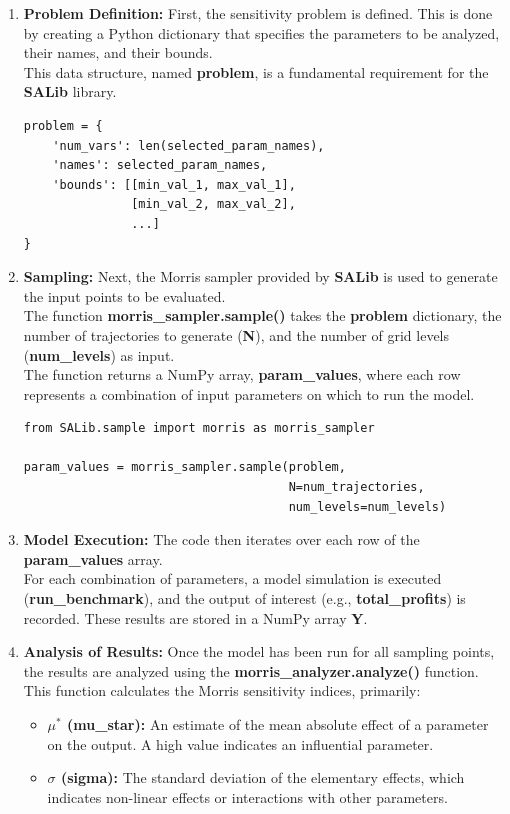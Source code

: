 \begin{enumerate}
    \item \textbf{Problem Definition:}
    First, the sensitivity problem is defined. This is done by creating a Python dictionary that specifies the parameters to be analyzed, their names, and their bounds. 
\\
\noindent
This data structure, named \textbf{problem}, is a fundamental requirement for the \textbf{SALib} library.
    
    \begin{verbatim}
problem = {
    'num_vars': len(selected_param_names),
    'names': selected_param_names,
    'bounds': [[min_val_1, max_val_1],
               [min_val_2, max_val_2],
               ...]
}
    \end{verbatim}

    \item \textbf{Sampling:}
    Next, the Morris sampler provided by \textbf{SALib} is used to generate the input points to be evaluated.
\\
\noindent
 The function \textbf{morris\_sampler.sample()} takes the \textbf{problem} dictionary, the number of trajectories to generate (\textbf{N}), and the number of grid levels (\textbf{num\_levels}) as input.
\\
\noindent
 The function returns a NumPy array, \textbf{param\_values}, where each row represents a combination of input parameters on which to run the model.
    
    \begin{verbatim}
from SALib.sample import morris as morris_sampler

param_values = morris_sampler.sample(problem, 
                                     N=num_trajectories, 
                                     num_levels=num_levels)
    \end{verbatim}

    \item \textbf{Model Execution:}
    The code then iterates over each row of the \textbf{param\_values} array. 
\\\noindent
For each combination of parameters, a model simulation is executed (\textbf{run\_benchmark}), and the output of interest (e.g., \textbf{total\_profits}) is recorded. These results are stored in a NumPy array \textbf{Y}.

    \item \textbf{Analysis of Results:}
\noindent
    Once the model has been run for all sampling points, the results are analyzed using the \textbf{morris\_analyzer.analyze()} function. This function calculates the Morris sensitivity indices, primarily:
    \begin{itemize}
        \item \textbf{$\mu^*$ (mu\_star):} An estimate of the mean absolute effect of a parameter on the output. A high value indicates an influential parameter.
        \item \textbf{$\sigma$ (sigma):} The standard deviation of the elementary effects, which indicates non-linear effects or interactions with other parameters.
    \end{itemize}
    

\end{enumerate}
